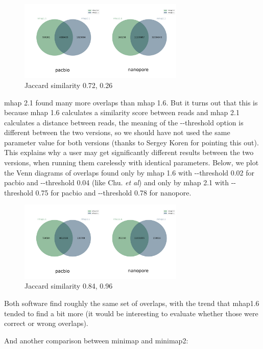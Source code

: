 \documentclass[./main.tex]{subfiles}
\begin{document}
\begin{figure}[ht]
\centering
\includegraphics[width=0.7\textwidth]{paper/blog_post/mhap_venn_same.png}
\caption{Jaccard similarity 0.72, 0.26}
\end{figure}



mhap 2.1 found many more overlaps than mhap 1.6. But it turns out that
this is because mhap 1.6 calculates a similarity score between reads and
mhap 2.1 calculates a distance between reads, the meaning of the
-\/-threshold option is different between the two versions, so we should
have not used the same parameter value for both versions (thanks to
Sergey Koren for pointing this out). This explains why a user may get
significantly different results between the two versions, when running
them carelessly with identical parameters. Below, we plot the Venn
diagrams of overlaps found only by mhap 1.6 with -\/-threshold 0.02 for
pacbio and -\/-threshold 0.04 (like Chu. \emph{et al}) and only by mhap
2.1 with -\/-threshold 0.75 for pacbio and -\/-threshold 0.78 for
nanopore.

\begin{figure}[ht]
\centering
\includegraphics[width=0.7\textwidth]{paper/blog_post/mhap_venn.png}
\caption{Jaccard similarity 0.84, 0.96}
\end{figure}


Both software find roughly the same set of overlaps, with the trend that
mhap1.6 tended to find a bit more (it would be interesting to evaluate
whether those were correct or wrong overlaps).

And another comparison between minimap and minimap2:
\end{document}
